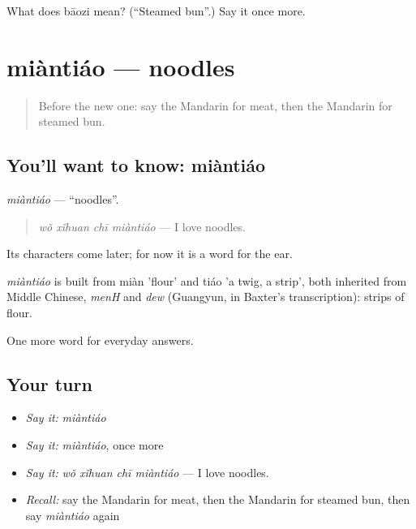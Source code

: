 \begin{tcolorbox}[breakable,colback=teal!4,colframe=teal!35!black,title={Before you move on}]
What does bāozi mean? (\textquotedblleft{}Steamed bun\textquotedblright{}.) Say it once more.
\end{tcolorbox}
\section[miàntiáo]{miàntiáo — noodles}

\label{lesson:ZH-C70-miantiao}



\begin{quote}
Before the new one: say the Mandarin for meat, then the Mandarin for steamed bun.
\end{quote}

\subsection*{You'll want to know: miàntiáo}
\emph{miàntiáo} — \textquotedblleft{}noodles\textquotedblright{}.

\begin{quote}
\emph{wǒ xǐhuan chī miàntiáo} — I love noodles.
\end{quote}

Its characters come later; for now it is a word for the ear.

\begin{cousinweb}
\emph{miàntiáo} is built from miàn 'flour' and tiáo 'a twig, a strip', both inherited from Middle Chinese, \emph{menH} and \emph{dew} (Guangyun, in Baxter's transcription): strips of flour.
\end{cousinweb}

\begin{grammarlens}[title={What you've built}]
One more word for everyday answers.
\end{grammarlens}

\subsection*{Your turn}
\begin{itemize}
\raggedright
  \item \emph{Say it:} \emph{miàntiáo}
  \item \emph{Say it:} \emph{miàntiáo}, once more
  \item \emph{Say it:} \emph{wǒ xǐhuan chī miàntiáo} — I love noodles.
  \item \emph{Recall:} say the Mandarin for meat, then the Mandarin for steamed bun, then say \emph{miàntiáo} again
\end{itemize}

